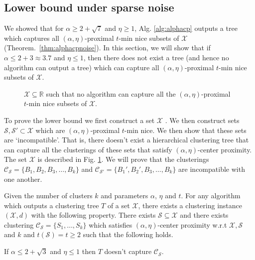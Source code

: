 \documentclass[anon,12pt]{colt2016} %
\newcommand{\mc}{\mathcal}
\begin{document}
\subsection{Lower bound under sparse noise}
\label{section:alphaLowerBoundSparse}

We showed that for $\alpha \ge 2 + \sqrt{7}$ and $\eta \ge 1$, Alg. \ref{alg:alphacp} outputs a tree which captures all $(\alpha, \eta)$-proximal $t$-min nice subsets of $\mc X$ (Theorem.~\ref{thm:alphacpnoise}). In this section, we will show that if $\alpha \le 2 + 3 \approx 3.7$ and $\eta \le 1$, then there does not exist a tree (and hence no algorithm can output a tree) which can capture all $(\alpha, \eta)$-proximal $t$-min nice subsets of $\mc X$.

\begin{figure}

\caption{$\mc X \subseteq \mathbb{R}$ such that no algorithm can capture all the $(\alpha, \eta)$-proximal $t$-min nice subsets of $\mc X$.}
\label{fig:noalgalphacp}
\end{figure}


To prove the lower bound we first construct a set $\mc X$ . We then construct sets $\mc S, \mc S' \subset \mc X$ which are $(\alpha, \eta)$-proximal $t$-min nice. We then show that these sets are `incompatible'. That is, there doesn't exist a  hierarchical clustering tree that can capture all the clusterings of these sets that satisfy $(\alpha, \eta)$-center proximity. The set $\mc X$ is described in Fig. \ref{fig:noalgalphacp}. We will prove that the clusterings $\mc C_{\mc S} = \{B_1, B_2, B_3, \ldots, B_k\}$ and $\mc C_{\mc S'} = \{B_1', B_2', B_3, \ldots, B_k\}$ are incompatible with one another.


\begin{theorem}
\label{thm:noalgalphacp}
Given the number of clusters $k$ and parameters $\alpha$, $\eta$ and $t$. For any algorithm which outputs a clustering tree $T$ of a set $\mc X$, there exists a clustering instance $(\mc X, d)$ with the following property. There exists $\mc S \subseteq \mc X$ and there exists clustering $\mc C_{\mc S} = \{S_1, \ldots, S_k\}$ which satisfies $(\alpha, \eta)$-center proximity w.r.t $\mc X, \mc S$ and $k$ and $ t(\mc S) = t \ge 2$ such that the following holds. 

If $\alpha \le 2 + \sqrt 3$ and $\eta \le 1$ then $T$ doesn't capture $\mc C_{\mc S}$.
\end{theorem}
\end{document}
